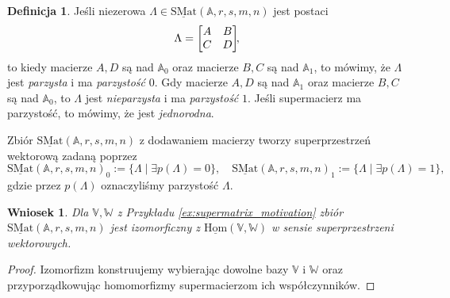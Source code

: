 \documentclass[11pt,a4paper]{report}
\newtheorem{corollary}[theorem]{Wniosek}
\theoremstyle{definition}
\newtheorem{definition}[theorem]{Definicja}
\begin{document}
\begin{definition}
\label{supermatrix_components_dimension}
 Jeśli niezerowa $\Lambda \in \underline{\mathrm{SMat}}(\mathbb{A},r,s,m,n)$ jest postaci
 \begin{equation}
 \newline \Lambda=\begin{bmatrix}
      A & B \\
      C & D
     \end{bmatrix}\!\!,
  \end{equation}
to kiedy macierze $A,D$ są nad $\mathbb{A}_0$ oraz macierze $B,C$ są nad $\mathbb{A}_1$, to mówimy, że $\Lambda$ jest \textit{parzysta} i ma \textit{parzystość} $0$. Gdy macierze $A,D$ są nad $\mathbb{A}_1$ oraz macierze $B,C$ są nad $\mathbb{A}_0$, to $\Lambda$ jest \textit{nieparzysta} i ma \textit{parzystość} $1$. Jeśli supermacierz ma parzystość, to mówimy, że jest \textit{jednorodna}.
\end{definition}

Zbiór $\underline{\mathrm{SMat}}(\mathbb{A},r,s,m,n)$ z dodawaniem macierzy tworzy superprzestrzeń wektorową zadaną poprzez
\begin{equation*}
 \underline{\mathrm{SMat}}(\mathbb{A},r,s,m,n)_0 := \{ \Lambda \mid \exists p(\Lambda)=0 \}, \quad \underline{\mathrm{SMat}}(\mathbb{A},r,s,m,n)_1 := \{ \Lambda \mid \exists p(\Lambda) = 1\},
\end{equation*}
gdzie przez $p(\Lambda)$ oznaczyliśmy parzystość $\Lambda$.

\begin{corollary}
 Dla $\mathbb{V}, \mathbb{W}$ z Przykładu \ref{ex:supermatrix_motivation} zbiór $\underline{\mathrm{SMat}}(\mathbb{A},r,s,m,n)$ jest izomorficzny z $\underline{\mathrm{Hom}}(\mathbb{V},\mathbb{W})$ w sensie superprzestrzeni wektorowych.
\end{corollary}

\begin{proof}
 Izomorfizm konstruujemy wybierając dowolne bazy $\mathbb{V}$ i $\mathbb{W}$ oraz przyporządkowując homomorfizmy supermacierzom ich współczynników.
\end{proof}
\end{document}

